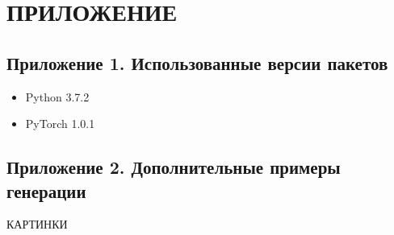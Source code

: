 \clearpage
\section*{\hfil ПРИЛОЖЕНИЕ \hfil}
	\subsection*{Приложение 1. Использованные версии пакетов}
		\begin{itemize}
			\item Python 3.7.2
			\item PyTorch 1.0.1
		\end{itemize}
	
	\subsection*{Приложение 2. Дополнительные примеры генерации}
	КАРТИНКИ